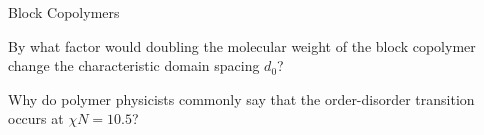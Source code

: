 \begin{activity}[extension]{Block Copolymers}
\begin{infobox}
\end{infobox}

\begin{ctqs}
		
	\question By what factor would doubling the molecular weight of the block copolymer change the characteristic domain spacing $d_0$?
	
		\begin{solution}[0.5in]
		\end{solution}
	
	\question Why do polymer physicists commonly say that the order-disorder transition occurs at $\chi N = 10.5$?
	
		\begin{solution}[0.5in]
		\end{solution}
	
\end{ctqs}


			
					
	
\end{activity}